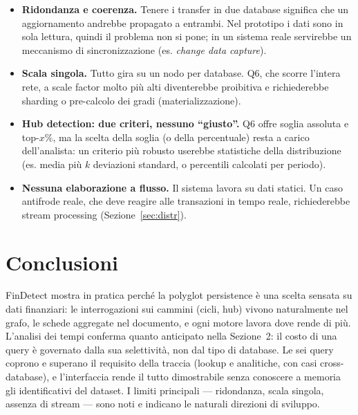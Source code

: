 \documentclass[11pt,a4paper]{article}
\begin{document}
\begin{itemize}[nosep]
  \item \textbf{Ridondanza e coerenza.} Tenere i transfer in due database
  significa che un aggiornamento andrebbe propagato a entrambi. Nel prototipo i
  dati sono in sola lettura, quindi il problema non si pone; in un sistema reale
  servirebbe un meccanismo di sincronizzazione (es. \emph{change data capture}).
  \item \textbf{Scala singola.} Tutto gira su un nodo per database. Q6, che
  scorre l'intera rete, a scale factor molto pi\`u alti diventerebbe proibitiva e
  richiederebbe sharding o pre-calcolo dei gradi (materializzazione).
  \item \textbf{Hub detection: due criteri, nessuno ``giusto''.} Q6 offre
  soglia assoluta e top-$x\%$, ma la scelta della soglia (o della percentuale)
  resta a carico dell'analista: un criterio pi\`u robusto userebbe statistiche
  della distribuzione (es. media pi\`u $k$ deviazioni standard, o percentili
  calcolati per periodo).
  \item \textbf{Nessuna elaborazione a flusso.} Il sistema lavora su dati
  statici. Un caso antifrode reale, che deve reagire alle transazioni in tempo
  reale, richiederebbe stream processing (Sezione~\ref{sec:distr}).
\end{itemize}

\section{Conclusioni}

FinDetect mostra in pratica perch\'e la polyglot persistence \`e una scelta
sensata su dati finanziari: le interrogazioni sui cammini (cicli, hub) vivono
naturalmente nel grafo, le schede aggregate nel documento, e ogni motore lavora
dove rende di pi\`u. L'analisi dei tempi conferma quanto anticipato nella
Sezione~2: il costo
di una query \`e governato dalla sua selettivit\`a, non dal tipo di database. Le
sei query coprono e superano il requisito della traccia (lookup e analitiche,
con casi cross-database), e l'interfaccia rende il tutto dimostrabile senza
conoscere a memoria gli identificativi del dataset. I limiti principali ---
ridondanza, scala singola, assenza di stream --- sono noti e indicano le
naturali direzioni di sviluppo.

\end{document}
